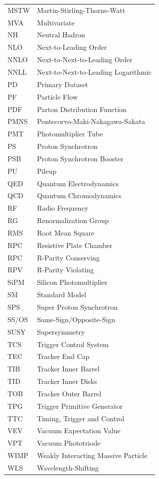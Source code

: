 \documentclass[12pt]{thesis}  %
\begin{document}
\begin{longtable}[l]{@{}l@{\ \ \ \ \ \ \ \ \ \ \ \ }l}
MSTW       & Martin-Stirling-Thorne-Watt \\
MVA        & Multivariate \\
NH         & Neutral Hadron \\
NLO        & Next-to-Leading Order \\
NNLO       & Next-to-Next-to-Leading Order \\
NNLL       & Next-to-Next-to-Leading Logarithmic \\
PD         & Primary Dataset \\
PF         & Particle Flow \\
PDF        & Parton Distribution Function \\
PMNS       & Pontecorvo-Maki-Nakagawa-Sakata \\
PMT        & Photomultiplier Tube \\
PS         & Proton Synchrotron \\
PSB        & Proton Synchrotron Booster \\
PU         & Pileup \\
QED        & Quantum Electrodynamics \\
QCD        & Quantum Chromodynamics \\
RF         & Radio Frequency \\
RG         & Renormalization Group \\
RMS        & Root Mean Square \\
RPC        & Resistive Plate Chamber \\
RPC        & R-Parity Conserving \\
RPV        & R-Parity Violating \\
SiPM       & Silicon Photomultiplier \\
SM         & Standard Model \\
SPS        & Super Proton Synchrotron \\
SS/OS      & Same-Sign/Opposite-Sign \\
SUSY       & Supersymmetry \\
TCS        & Trigger Control System \\
TEC        & Tracker End Cap \\
TIB        & Tracker Inner Barrel \\
TID        & Tracker Inner Disks \\
TOB        & Tracker Outer Barrel \\
TPG        & Trigger Primitive Generator \\
TTC        & Timing, Trigger and Control \\
VEV        & Vacuum Expectation Value \\
VPT        & Vacuum Phototriode \\
WIMP       & Weakly Interacting Massive Particle \\
WLS        & Wavelength-Shifting \\
\end{longtable}
\end{document}
